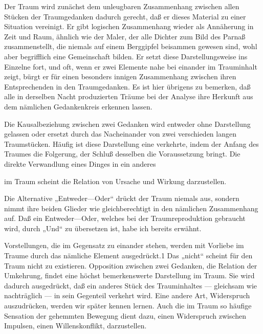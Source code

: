 \documentclass[twoside=true,titlepage=false,open=any, parskip=never, fontsize=10pt, headings=small, chapterprefix=false, appendixprefix=false]{scrbook}
\begin{document}
            
        \pstart
        Der Traum wird zunächst dem unleugbaren Zusammenhang zwischen allen Stücken der
               Traumgedanken dadurch gerecht, daß er dieses Material zu einer Situation
               vereinigt. Er gibt logischen Zusammenhang wieder
               als Annäherung in Zeit und Raum, ähnlich wie der
               Maler, der alle Dichter zum Bild des Parnaß zusammenstellt, die niemals auf
               einem Berggipfel beisammen gewesen sind, wohl aber begrifflich eine
               Gemeinschaft bilden. Er setzt diese Darstellungsweise ins Einzelne fort,
               und oft, wenn er zwei Elemente nahe bei einander im Trauminhalt zeigt,
               bürgt er für einen besonders innigen Zusammenhang zwischen ihren Entsprechenden
               in den Traumgedanken. Es ist hier übrigens zu bemerken, daß alle in derselben
               Nacht produzierten Träume bei der Analyse ihre Herkunft aus dem nämlichen
               Gedankenkreis erkennen lassen.
        \pend
    
            
        \pstart
        Die Kausalbeziehung zwischen zwei Gedanken wird
                  entweder ohne Darstellung gelassen oder ersetzt durch das Nacheinander von zwei verschieden langen Traumstücken. Häufig ist diese
               Darstellung eine verkehrte, indem der Anfang des Traumes die Folgerung, der
               Schluß desselben die Voraussetzung bringt. Die direkte Verwandlung eines Dinges in ein anderes
        \pend
    
         
            
            
            
        \pstart
        im Traum scheint die Relation von Ursache
               und Wirkung darzustellen.
        \pend
    
            
        \pstart
        Die Alternative „Entweder—Oder“ drückt der Traum
               niemals aus, sondern nimmt ihre beiden Glieder wie gleichberechtigt
               in den nämlichen Zusammenhang auf. Daß ein Entweder—Oder, welches bei
               der Traumreproduktion gebraucht wird, durch „Und“ zu übersetzen ist, habe ich bereits erwähnt.
        \pend
    
            
        \pstart
        Vorstellungen, die im Gegensatz zu einander stehen, werden mit Vorliebe im
               Traume durch das nämliche Element ausgedrückt.1 Das „nicht“ scheint für den Traum nicht zu existieren. Opposition
               zwischen zwei Gedanken, die Relation der Umkehrung,
               findet eine höchst bemerkenswerte Darstellung im Traum. Sie wird dadurch
               ausgedrückt, daß ein anderes Stück des Trauminhaltes — gleichsam wie
               nachträglich — in sein Gegenteil verkehrt wird. Eine andere Art, Widerspruch auszudrücken, werden wir später
               kennen lernen. Auch die im Traum so häufige Sensation der gehemmten Bewegung dient dazu, einen Widerspruch
               zwischen Impulsen, einen Willenskonflikt,
               darzustellen.
        \pend
    
\end{document}
